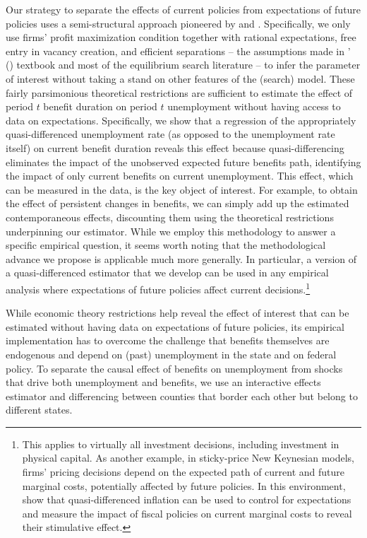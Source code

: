 \documentclass[12pt]{article}
\newcommand{\1}{\mathbf{1}}
\begin{document}
Our strategy to separate the effects of current policies from expectations of future policies uses a semi-structural approach pioneered by \citet{hansen:82} and \citet{hansen_singelton:82}. Specifically, we only use firms' profit maximization condition together with rational expectations, free entry in vacancy creation, and efficient separations -- the assumptions made in \citeauthor{pissarides:00}' (\citeyear{pissarides:00}) textbook and most of the equilibrium search literature -- to infer the parameter of interest without taking a stand on other features of the (search) model. These fairly parsimonious theoretical restrictions are sufficient to estimate the effect of period $t$ benefit duration on period $t$ unemployment without having access to data on expectations. Specifically, we show that a regression of the appropriately quasi-differenced unemployment rate (as opposed to the unemployment rate itself) on current benefit duration reveals this effect because quasi-differencing eliminates the impact of the unobserved expected future benefits path, identifying the impact of only current benefits on current unemployment. This effect, which can be measured in the data, is the key object of interest. For example, to obtain the effect of persistent changes in benefits, we can simply add up the estimated contemporaneous effects, discounting them using the theoretical restrictions underpinning our estimator. %
While we employ this methodology to answer a specific empirical question, it seems worth noting that the methodological advance we propose is applicable much more generally. In particular, a version of a quasi-differenced estimator that we develop can be used in any empirical analysis where expectations of future policies affect current decisions.\footnote{This applies to virtually all investment decisions, including investment in physical capital. As another example, in sticky-price New Keynesian models, firms' pricing decisions depend on the expected path of current and future marginal costs, potentially affected by future policies. In this environment, \citet{hagedorn+handbury+manovskii:15} show that quasi-differenced inflation can be used to control for expectations and measure the impact of fiscal policies on current marginal costs to reveal their stimulative effect.}

While economic theory restrictions help reveal the effect of interest that can be estimated without having data on expectations of future policies, its empirical implementation has to overcome the challenge that benefits themselves are endogenous and depend on (past) unemployment in the state and on federal policy. To separate the causal effect of benefits on unemployment from shocks that drive both unemployment and benefits, we use an interactive effects estimator and differencing between counties that border each other but belong to different states.
\end{document}

